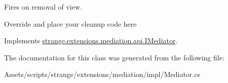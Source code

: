Fires on removal of view. 

Override and place your cleanup code here 

Implements \hyperlink{interfacestrange_1_1extensions_1_1mediation_1_1api_1_1_i_mediator_a7d1c9db89dbe71b80f0fb56fd3012def}{strange.\-extensions.\-mediation.\-api.\-I\-Mediator}.



The documentation for this class was generated from the following file\-:\begin{DoxyCompactItemize}
\item 
Assets/scripts/strange/extensions/mediation/impl/Mediator.\-cs\end{DoxyCompactItemize}
